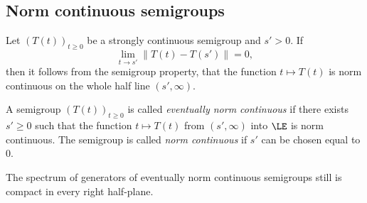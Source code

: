 \subsection{Norm continuous semigroups} \label{subsec:a2-1.se6}%
Let $(T(t))_{t\geq 0}$ be a strongly continuous semigroup and $s' > 0$.
If\/ 
%
\[
	\lim_{t \to s'} \|T(t) - T(s')\| = 0 ,
\]
%
then it follows from the semigroup property, that the function $t \mapsto T(t)$ is norm continuous on the whole half line $(s',\infty)$.

\begin{definition}\label{def:a2-1.19}
A semigroup $(T(t))_{t\geq 0}$ is called \emph{eventually norm continuous} if there exists $s' \geq 0$ such that the function $t \mapsto T(t)$ from $(s',\infty)$ into $\LE$ is norm continuous.
The semigroup is called \emph{norm continuous} if\/ $s'$ can be chosen equal to $0$.
\end{definition}

The spectrum of generators of eventually norm continuous semigroups still is compact in every right half-plane.

